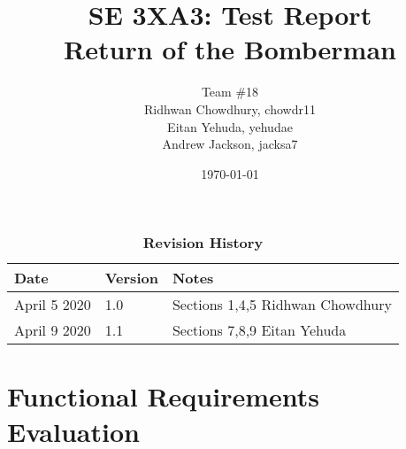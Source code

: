 \documentclass[12pt, titlepage]{article}
\title{SE 3XA3: Test Report\\Return of the Bomberman}
\author{Team \#18
		\\ Ridhwan Chowdhury, chowdr11
		\\ Eitan Yehuda, yehudae
		\\ Andrew Jackson, jacksa7
}
\date{\today}
\begin{document}
\maketitle

\tableofcontents
\listoftables

\begin{table}[bp]
\caption{\bf Revision History}
\begin{tabularx}{\textwidth}{p{3cm}p{2cm}X}
\toprule {\bf Date} & {\bf Version} & {\bf Notes}\\
\midrule
April 5 2020 & 1.0 & Sections 1,4,5 Ridhwan Chowdhury\\
April 9 2020 & 1.1 & Sections 7,8,9 Eitan Yehuda\\
\bottomrule
\end{tabularx}
\end{table}

\newpage


\section{Functional Requirements Evaluation}
\end{document}
